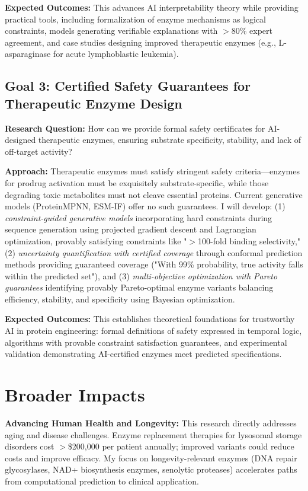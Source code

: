 \documentclass[11pt]{article}
\begin{document}
\textbf{Expected Outcomes:} This advances AI interpretability theory while
providing practical tools, including formalization of enzyme mechanisms as
logical constraints, models generating verifiable explanations with $>$80\%
expert agreement, and case studies designing improved therapeutic enzymes (e.g.,
L-asparaginase for acute lymphoblastic leukemia).

\subsection*{Goal 3: Certified Safety Guarantees for Therapeutic Enzyme Design}

\textbf{Research Question:} How can we provide formal safety certificates for
AI-designed therapeutic enzymes, ensuring substrate specificity, stability, and
lack of off-target activity?

\textbf{Approach:} Therapeutic enzymes must satisfy stringent safety
criteria—enzymes for prodrug activation must be exquisitely substrate-specific,
while those degrading toxic metabolites must not cleave essential proteins.
Current generative models (ProteinMPNN, ESM-IF) offer no such guarantees. I will
develop: (1) \textit{constraint-guided generative models} incorporating hard
constraints during sequence generation using projected gradient descent and
Lagrangian optimization, provably satisfying constraints like "$>$100-fold
binding selectivity," (2) \textit{uncertainty quantification with certified
coverage} through conformal prediction methods providing guaranteed coverage
("With 99\% probability, true activity falls within the predicted set"), and (3)
\textit{multi-objective optimization with Pareto guarantees} identifying
provably Pareto-optimal enzyme variants balancing efficiency, stability, and
specificity using Bayesian optimization.

\textbf{Expected Outcomes:} This establishes theoretical foundations for
trustworthy AI in protein engineering: formal definitions of safety expressed in
temporal logic, algorithms with provable constraint satisfaction guarantees, and
experimental validation demonstrating AI-certified enzymes meet predicted
specifications.

\section*{Broader Impacts}

\textbf{Advancing Human Health and Longevity:} This research directly addresses
aging and disease challenges. Enzyme replacement therapies for lysosomal storage
disorders cost $>$\$200,000 per patient annually; improved variants could reduce
costs and improve efficacy. My focus on longevity-relevant enzymes (DNA repair
glycosylases, NAD+ biosynthesis enzymes, senolytic proteases) accelerates paths
from computational prediction to clinical application.
\end{document}
